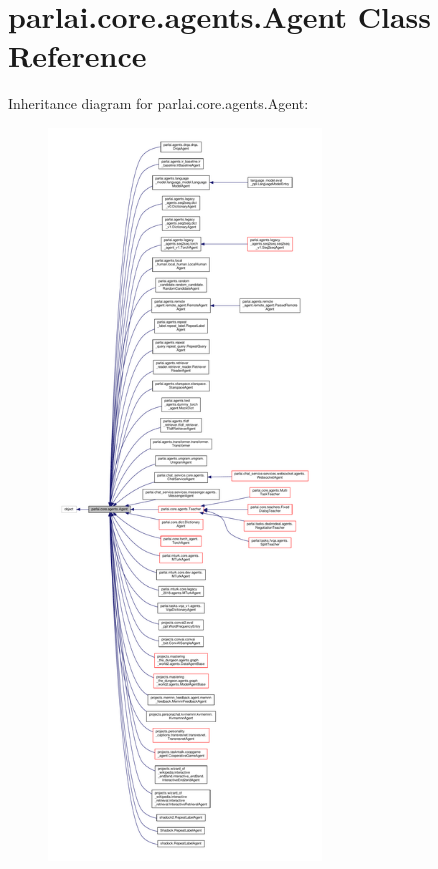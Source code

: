 \hypertarget{classparlai_1_1core_1_1agents_1_1Agent}{}\section{parlai.\+core.\+agents.\+Agent Class Reference}
\label{classparlai_1_1core_1_1agents_1_1Agent}


Inheritance diagram for parlai.\+core.\+agents.\+Agent\+:
\nopagebreak
\begin{figure}[H]
\begin{center}
\leavevmode
\includegraphics[height=550pt]{d1/d59/classparlai_1_1core_1_1agents_1_1Agent__inherit__graph}
\end{center}
\end{figure}


